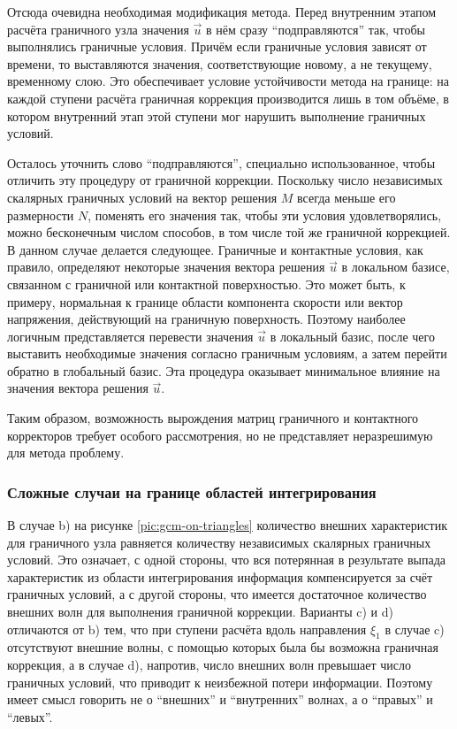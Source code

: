 Отсюда очевидна необходимая модификация метода. Перед внутренним этапом расчёта 
граничного узла значения $\vec{u}$ в нём сразу ``подправляются'' так, чтобы выполнялись 
граничные условия. Причём если граничные условия зависят от времени, то выставляются 
значения, соответствующие новому, а не текущему, временному слою. Это обеспечивает условие 
устойчивости метода на границе: на каждой ступени расчёта граничная коррекция производится лишь в том 
объёме, в котором внутренний этап этой ступени мог нарушить выполнение граничных условий.

Осталось уточнить слово ``подправляются'', специально использованное, 
чтобы отличить эту процедуру от граничной коррекции. 
Поскольку число независимых скалярных граничных условий на вектор решения $M$
всегда меньше его размерности $N$, поменять его значения так, чтобы эти условия  
удовлетворялись, можно бесконечным числом способов, 
в том числе той же граничной коррекцией. В данном случае делается следующее. 
Граничные и контактные условия, как правило, определяют некоторые значения 
вектора решения $\vec{u}$ в локальном базисе, связанном с граничной или контактной поверхностью. 
Это может быть, к примеру, нормальная к границе области компонента скорости или 
вектор напряжения, действующий на граничную поверхность. Поэтому наиболее логичным 
представляется перевести значения $\vec{u}$ в локальный базис, после чего 
выставить необходимые значения согласно граничным условиям, а затем перейти 
обратно в глобальный базис. 
Эта процедура оказывает минимальное влияние на значения вектора решения $\vec{u}$. 

Таким образом, возможность вырождения матриц граничного и контактного корректоров 
требует особого рассмотрения, но не представляет неразрешимую для метода проблему.


\subsubsection{Сложные случаи на границе областей интегрирования}
В случае b) на рисунке \ref{pic:gcm-on-triangles} 
количество внешних характеристик для граничного узла равняется количеству независимых 
скалярных граничных условий. Это означает, с одной стороны, 
что вся потерянная в результате выпада характеристик из области интегрирования информация 
компенсируется за счёт граничных условий, а с другой стороны, 
что имеется достаточное количество внешних волн для выполнения граничной коррекции. 
Варианты c) и d) отличаются от b) тем, что при ступени расчёта вдоль направления $\xi_1$ 
в случае c) отсутствуют внешние волны, с помощью которых была бы возможна граничная коррекция, 
а в случае d), напротив, число внешних волн превышает число граничных условий, что 
приводит к неизбежной потери информации. Поэтому имеет смысл говорить не о 
``внешних'' и ``внутренних'' волнах, а о ``правых'' и ``левых''.

